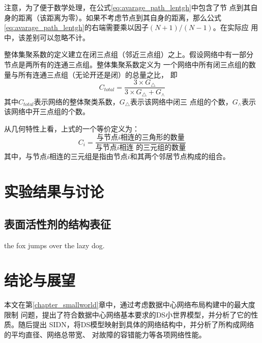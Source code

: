 \documentclass[bachelor,winfonts]{jnuthesis} %
\begin{document}
    注意，为了便于数学处理，在公式\eqref{eq:avarage_path_lentgh}中包含了节
    点到其自身的距离（该距离为零）。如果不考虑节点到其自身的距离，那么公式
    \eqref{eq:avarage_path_lentgh}的右端需要乘以因子$(N+1)/(N-1)$。在实际应
    用中，该差别可以忽略不计。
    
    \begin{definition}[整体聚类系数]
        整体集聚系数的定义建立在闭三点组（邻近三点组）之上。假设网络中有一部分
        节点是两所有的连通三点组。整体集聚系数定义为
        一个网络中所有闭三点组的数量与所有连通三点组（无论开还是闭）的总量之比，
        即
        \[
        C_{total}=\frac{3\times G_{\triangle}}{3 \times G_{\triangle} + G_{\wedge}}
        \]
        其中$C_{total}$表示网络的整体聚类系数，$G_{\triangle}$表示该网络中闭三
        点组的个数，$G_{\wedge}$表示该网络中开三点组的个数\cite{luce1949method}。
    \end{definition}
    
    \begin{definition}[局部聚类系数]
        从几何特性上看，上式的一个等价定义为：
        \begin{equation}\label{eq:clustering_coefficient_triangle}
        C_i = \frac{\text{与节点$i$相连的三角形的数量}}{\text{与节点$i$相连
                的三元组的数量}}
        \end{equation}
        其中，与节点$i$相连的三元组是指由节点$i$和其两个邻居节点构成的组合。
    \end{definition}
    
    \chapter{实验结果与讨论}\label{chapter:results}
    \section{表面活性剂的结构表征}
    the fox jumps over the lazy dog.
        
    \chapter{结论与展望}\label{chapter:concludes}
    
    本文在第\ref{chapter_smallworld}章中，通过\cite{newman2001structure}考虑数据中心网络布局构建中的最大度限制
    问题，提出了符合数据中心网络基本要求的DS小世界模型，并分析了它的性质。随后提出
    SIDN，将DS模型映射到具体的网络结构中，并分析了所构成网络的平均直径、网络总带宽、
    对故障的容错能力等各项网络性能。
    
\end{document}
